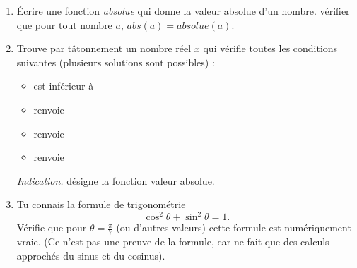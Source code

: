 \documentclass[11pt,class=report,crop=false]{standalone}
\begin{document}
\begin{activite}


\begin{enumerate}

 \item Écrire une fonction \emph{absolue} qui donne la valeur absolue d'un nombre. vérifier que pour tout nombre $a$, $abs(a)=absolue(a)$.


  
  \item Trouve par tâtonnement un nombre réel $x$ qui vérifie toutes les conditions suivantes (plusieurs solutions sont possibles) :
  \begin{itemize}
    \item {} est inférieur à 
    \item {} renvoie 
    \item {} renvoie 
    \item {} renvoie  
  \end{itemize}
 
  \emph{Indication.}  désigne la fonction valeur absolue.
  
  \item Tu connais la formule de trigonométrie 
  $$\cos^2 \theta + \sin^2 \theta = 1.$$
  Vérifie que pour $\theta = \frac\pi7$ (ou d'autres valeurs) cette formule est numériquement vraie. (Ce n'est pas une preuve de la formule, car \Python{} ne fait que des calculs approchés du sinus et du cosinus).
\end{enumerate}  
\end{activite}

\end{document}
